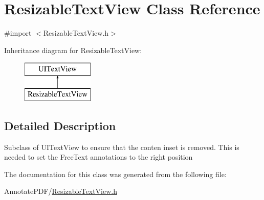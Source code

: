 \hypertarget{interface_resizable_text_view}{\section{Resizable\-Text\-View Class Reference}
\label{interface_resizable_text_view}
}


{\ttfamily \#import $<$Resizable\-Text\-View.\-h$>$}

Inheritance diagram for Resizable\-Text\-View\-:\begin{figure}[H]
\begin{center}
\leavevmode
\includegraphics[height=2.000000cm]{interface_resizable_text_view}
\end{center}
\end{figure}


\subsection{Detailed Description}
Subclass of U\-I\-Text\-View to ensure that the conten inset is removed. This is needed to set the Free\-Text annotations to the right position 

The documentation for this class was generated from the following file\-:\begin{DoxyCompactItemize}
\item 
Annotate\-P\-D\-F/\hyperlink{_resizable_text_view_8h}{Resizable\-Text\-View.\-h}\end{DoxyCompactItemize}
